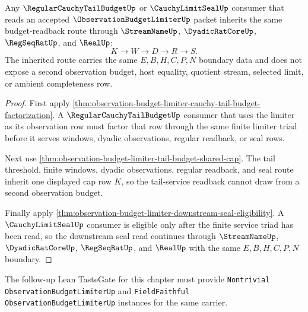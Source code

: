 \begin{theorem}
\label{thm:observation-budget-limiter-tail-service-downstream-readback}
Any $\RegularCauchyTailBudgetUp$ or $\CauchyLimitSealUp$ consumer that reads an accepted $\ObservationBudgetLimiterUp$ packet inherits the same budget-readback route through $\StreamNameUp$, $\DyadicRatCoreUp$, $\RegSeqRatUp$, and $\RealUp$:
$$
K \to W \to D \to R \to S.
$$
The inherited route carries the same $E,B,H,C,P,N$ boundary data and does not expose a second observation budget, host equality, quotient stream, selected limit, or ambient completeness row.
\end{theorem}
\begin{proof}
First apply \autoref{thm:observation-budget-limiter-cauchy-tail-budget-factorization}. A $\RegularCauchyTailBudgetUp$ consumer that uses the limiter as its observation row must factor that row through the same finite limiter triad before it serves windows, dyadic observations, regular readback, or seal rows.

Next use \autoref{thm:observation-budget-limiter-tail-budget-shared-cap}. The tail threshold, finite windows, dyadic observations, regular readback, and seal route inherit one displayed cap row $K$, so the tail-service readback cannot draw from a second observation budget.

Finally apply \autoref{thm:observation-budget-limiter-downstream-seal-eligibility}. A $\CauchyLimitSealUp$ consumer is eligible only after the finite service triad has been read, so the downstream seal read continues through $\StreamNameUp$, $\DyadicRatCoreUp$, $\RegSeqRatUp$, and $\RealUp$ with the same $E,B,H,C,P,N$ boundary.
\end{proof}

The follow-up Lean TasteGate for this chapter must provide \texttt{Nontrivial ObservationBudgetLimiterUp} and \texttt{FieldFaithful ObservationBudgetLimiterUp} instances for the same carrier.


